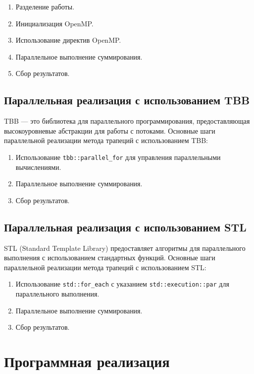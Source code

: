 \documentclass[]{article}
\theoremstyle{remark}
\theoremstyle{definition}
\begin{document}
\begin{enumerate}
    \item Разделение работы.
    \item Инициализация OpenMP.
    \item Использование директив OpenMP.
    \item Параллельное выполнение суммирования.
    \item Сбор результатов.
\end{enumerate}

\subsection{Параллельная реализация с использованием TBB}

\par TBB — это библиотека для параллельного программирования, предоставляющая высокоуровневые абстракции для работы с потоками. Основные шаги параллельной реализации метода трапеций с использованием TBB:

\begin{enumerate}
    \item Использование \texttt{tbb::parallel\_for} для управления параллельными вычислениями.
    \item Параллельное выполнение суммирования.
    \item Сбор результатов.
\end{enumerate}

\subsection{Параллельная реализация с использованием STL}

\par STL (Standard Template Library) предоставляет алгоритмы для параллельного выполнения с использованием стандартных функций. Основные шаги параллельной реализации метода трапеций с использованием STL:

\begin{enumerate}
    \item Использование \texttt{std::for\_each} с указанием \texttt{std::execution::par} для параллельного выполнения.
    \item Параллельное выполнение суммирования.
    \item Сбор результатов.
\end{enumerate}

\newpage

\section{Программная реализация}
\end{document}
